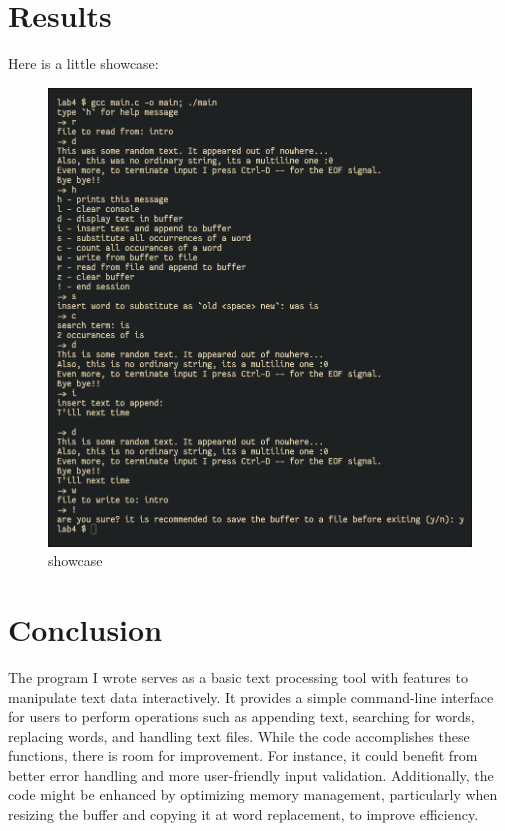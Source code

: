 \documentclass[12pt]{article}
\begin{document}
\section*{Results}
\hspace{0.8cm}
Here is a little showcase:

\begin{figure}[!h]
  \centering
  \includegraphics[width=6in]{texted.png}
  \caption{showcase}
\end{figure}

\section*{Conclusion}
\hspace{0.8cm}
The program I wrote serves as a basic text processing tool with features to manipulate text data interactively. It provides a simple command-line interface for users to perform operations such as appending text, searching for words, replacing words, and handling text files. While the code accomplishes these functions, there is room for improvement. For instance, it could benefit from better error handling and more user-friendly input validation. Additionally, the code might be enhanced by optimizing memory management, particularly when resizing the buffer and copying it at word replacement, to improve efficiency.
\end{document}
